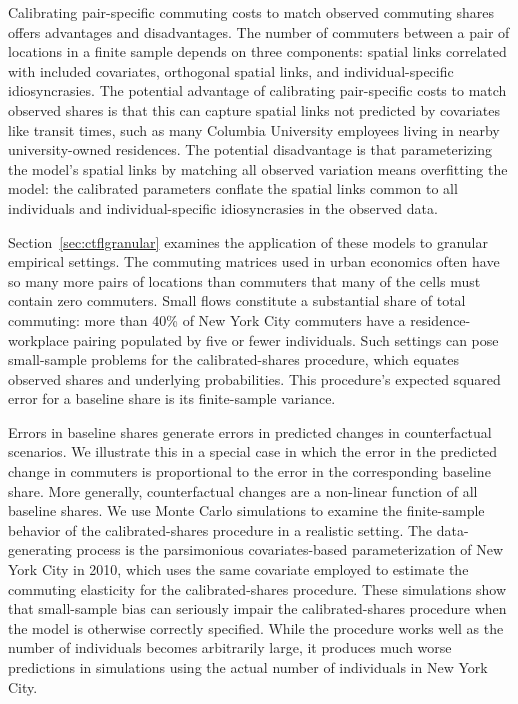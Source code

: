 \documentclass[11pt]{article}
\theoremstyle{definition}
\begin{document}
Calibrating pair-specific commuting costs to match observed commuting shares offers advantages and disadvantages.
The number of commuters between a pair of locations in a finite sample depends on three components:
spatial links correlated with included covariates,
orthogonal spatial links,
and
individual-specific idiosyncrasies.
The potential advantage of calibrating pair-specific costs to match observed shares is that this
can capture spatial links not predicted by covariates like transit times,
such as many Columbia University employees living in nearby university-owned residences.
The potential disadvantage is that 
parameterizing the model's spatial links by matching all observed variation means overfitting the model:
the calibrated parameters conflate the spatial links common to all individuals and individual-specific idiosyncrasies in the observed data.

Section~\ref{sec:ctflgranular} examines the application of these models to granular empirical settings.
The commuting matrices used in urban economics often
have so many more pairs of locations than commuters
that many of the cells must contain zero commuters.
Small flows constitute a substantial share of total commuting: 
more than 40\% of New York City commuters have a residence-workplace pairing populated by five or fewer individuals.
Such settings can pose small-sample problems for the calibrated-shares procedure,
which equates observed shares and underlying probabilities.
This procedure's expected squared error for a baseline share is its finite-sample variance.

Errors in baseline shares generate errors in predicted changes in counterfactual scenarios.
We illustrate this in a special case in which 
the error in the predicted change in commuters is proportional to the error in the corresponding baseline share.
More generally,
counterfactual changes are a non-linear function of all baseline shares.
We use Monte Carlo simulations to examine the finite-sample behavior of the calibrated-shares procedure in a realistic setting.
The data-generating process is the parsimonious covariates-based parameterization of New York City in 2010,
which uses the same covariate employed to estimate the commuting elasticity for the calibrated-shares procedure.
These simulations show that small-sample bias can seriously impair the calibrated-shares procedure when the model is otherwise correctly specified.
While the procedure works well as the number of individuals becomes arbitrarily large,
it produces much worse predictions in simulations using the actual number of individuals in New York City.
\end{document}
